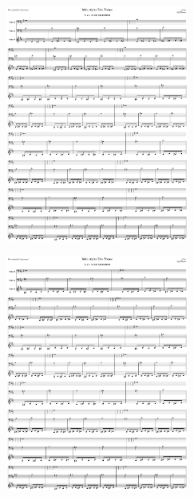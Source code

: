 \begin{figure}[H]                                             
{                                                             
  \setlength{\tabcolsep}{3.0pt}                               
  \setlength\cmidrulewidth{\heavyrulewidth} %
    \begin{subfigure}{0.5\textwidth}                            
  \includegraphics[width=6cm]{music/title_no_21_page_1001.png}%
    \end{subfigure}                                             
  \begin{subfigure}{0.5\textwidth}                            
  \includegraphics[width=6cm]{music/title_no_22_page_1001.png}%
    \end{subfigure}                                             
}                                                             
\end{figure}                                                  


